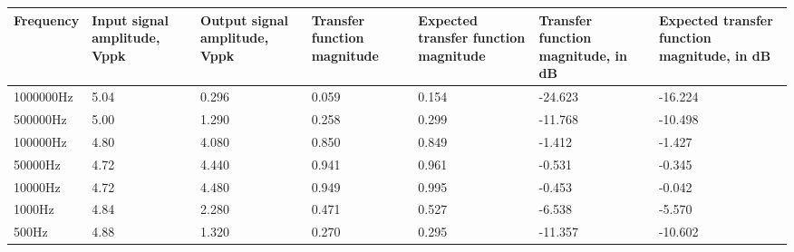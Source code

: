 \begin{table}[!h]
\begin{center}
\begin{tabular}{|p{2cm}|p{2cm}|p{2cm}|p{2cm}|p{2cm}|p{2cm}|p{2cm}|}
\hline
Frequency & Input signal amplitude, Vppk & Output signal amplitude, Vppk & Transfer function magnitude & Expected transfer function magnitude & Transfer function magnitude, in dB & Expected transfer function magnitude, in dB \\
\hline
1000000Hz	&	5.04	&	0.296	&	0.059	&	0.154	&	-24.623	&	-16.224	\\
\hline
500000Hz	&	5.00	&	1.290	&	0.258	&	0.299	&	-11.768	&	-10.498	\\
\hline
100000Hz	&	4.80	&	4.080	&	0.850	&	0.849	&	-1.412	&	-1.427	\\
\hline
50000Hz	&	4.72	&	4.440	&	0.941	&	0.961	&	-0.531	&	-0.345	\\
\hline
10000Hz	&	4.72	&	4.480	&	0.949	&	0.995	&	-0.453	&	-0.042	\\
\hline
1000Hz	&	4.84	&	2.280	&	0.471	&	0.527	&	-6.538	&	-5.570	\\
\hline
500Hz	&	4.88	&	1.320	&	0.270	&	0.295	&	-11.357	&	-10.602	\\
\hline
\end{tabular}
\label{tab-band_pass}
\end{center}
\end{table}
